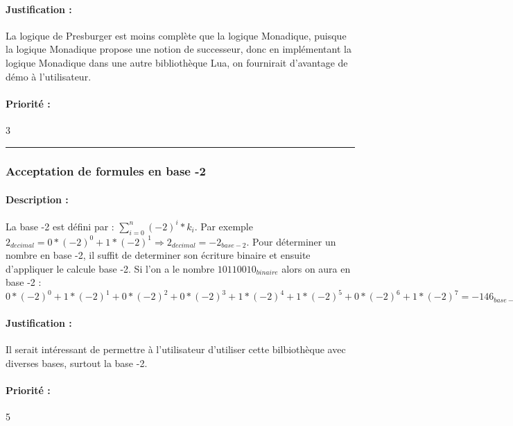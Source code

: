 \paragraph{Justification :} La logique de Presburger est moins complète que la logique Monadique, puisque la logique Monadique propose une notion de successeur, donc en implémentant la logique Monadique dans une autre bibliothèque Lua, on fournirait d'avantage de démo à l'utilisateur.

\paragraph{Priorité :} 3\\

\rule{\linewidth}{1pt}

\subsubsection{Acceptation de formules en base -2}

\paragraph{Description :} La base -2 est défini par : $ \sum\limits_{i=0}^n (-2)^i * k_i$. Par exemple $2_{decimal} = 0 * (-2)^0 + 1 * (-2)^1 \Rightarrow 2_{decimal} = -2_{base - 2}$. Pour déterminer un nombre en base -2, il suffit de determiner son écriture binaire et ensuite d'appliquer le calcule base -2. Si l'on a le nombre $10110010_{binaire}$ alors on aura en base -2 : $0 * (-2)^0 + 1 * (-2)^1 + 0 * (-2)^2 + 0 * (-2)^3 + 1 * (-2)^4 + 1 * (-2)^5 + 0 * (-2)^6 + 1 * (-2)^7 = -146_{base - 2}$

\paragraph{Justification :} Il serait intéressant de permettre à l'utilisateur d'utiliser cette bilbiothèque avec diverses bases, surtout la base -2.

\paragraph{Priorité :} 5
